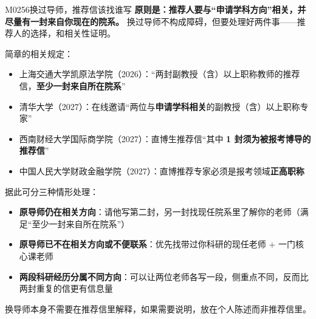 \begin{qa}{M0256}{换过导师，推荐信该找谁写}
\textbf{原则是：推荐人要与“申请学科方向”相关，并尽量有一封来自你现在的院系。} 换过导师不构成障碍，但要处理好两件事——推荐人的选择，和相关性证明。

简章的相关规定：

\begin{itemize}
  \item 上海交通大学凯原法学院（2026）：“两封副教授（含）以上职称教师的推荐信，\textbf{至少一封来自所在院系}”
  \item 清华大学（2027）：在线邀请“两位与\textbf{申请学科相关}的副教授（含）以上职称专家”
  \item 西南财经大学国际商学院（2027）：直博生推荐信“其中 \textbf{1 封须为被报考博导的推荐信}”
  \item 中国人民大学财政金融学院（2027）：直博推荐专家必须是报考领域\textbf{正高职称}
\end{itemize}

据此可分三种情形处理：

\begin{itemize}
  \item \textbf{原导师仍在相关方向}：请他写第二封，另一封找现任院系里了解你的老师（满足“至少一封来自所在院系”）
  \item \textbf{原导师已不在相关方向或不便联系}：优先找带过你科研的现任老师 + 一门核心课老师
  \item \textbf{两段科研经历分属不同方向}：可以让两位老师各写一段，侧重点不同，反而比两封重复的信更有信息量
\end{itemize}

换导师本身不需要在推荐信里解释，如果需要说明，放在个人陈述而非推荐信里。
\end{qa}

